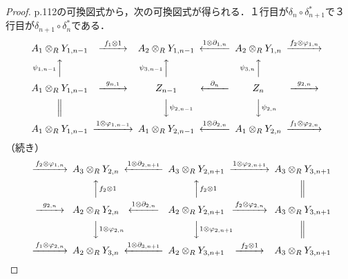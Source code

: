 \begin{proof}
  p.112の可換図式から，次の可換図式が得られる．１行目が$\delta_n \circ \delta_{n+1}^\ast$で３行目が$\delta_{n+1} \circ \delta_n^\ast$である．
  \[
  \begin{CD}
    A_1 \otimes_R Y_{1, n-1} @>{f_1 \otimes 1}>> A_2 \otimes_R Y_{1, n-1} @<{1 \otimes \partial_{1, n}}<< A_2 \otimes_R Y_{1, n} @>{f_2 \otimes \varphi_{1, n}}>> \\
    @A{\psi_{1, n-1}}AA @A{\psi_{3, n-1}}AA @A{\psi_{3, n}}AA \\
    A_1 \otimes_R Y_{1, n-1} @>{g_{n, 1}}>> Z_{n-1} @<{\partial_n}<< Z_n  @>{g_{2,n}}>> \\
    @| @VV{\psi_{2, n-1}}V @VV{\psi_{2, n}}V \\
    A_1 \otimes_R Y_{1, n-1} @>{1 \otimes \varphi_{1, n-1}}>> A_1 \otimes_R Y_{2, n-1} @<{1 \otimes \partial_{2, n}}<< A_1 \otimes_R Y_{2, n} @>{f_1 \otimes \varphi_{2, n}}>>
  \end{CD}
  \]
  （続き）
  \[
  \begin{CD}
    @>{f_2 \otimes \varphi_{1, n}}>>  A_3 \otimes_R Y_{2, n} @<{1 \otimes \partial_{2, n+1}}<< A_3 \otimes_R Y_{2, n+1} @>{1 \otimes \varphi_{2, n+1}}>> A_3 \otimes_R Y_{3, n+1} \\
    @. @AA{f_2 \otimes 1}A @AA{f_2 \otimes 1}A @| \\
    @>{g_{2,n}}>>  A_2 \otimes_R Y_{2, n} @<{1 \otimes \partial_{2, n}}<< A_2 \otimes_R Y_{2, n+1} @>{f_2 \otimes \varphi_{2, n}}>> A_3 \otimes_R Y_{3, n+1} \\
    @. @VV{1 \otimes \varphi_{2, n}}V @VV{1 \otimes \varphi_{2, n+1}}V @| \\
    @>{f_1 \otimes \varphi_{2, n}}>> A_2 \otimes_R Y_{3, n} @<{1 \otimes \partial_{3, n+1}}<< A_2 \otimes_R Y_{3, n+1} @>{f_2 \otimes 1}>> A_3 \otimes_R Y_{3, n+1}
  \end{CD}
  \]

\end{proof}
